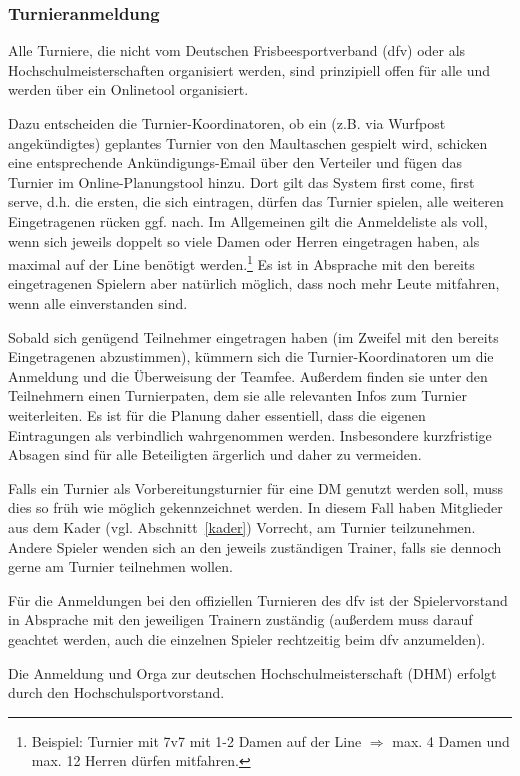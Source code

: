 \documentclass[a4 paper, 11pt]{article}
\begin{document}
\subsubsection{Turnieranmeldung}
Alle Turniere, die nicht vom Deutschen Frisbeesportverband (dfv) oder als Hochschulmeisterschaften organisiert werden, sind prinzipiell offen für alle und werden über ein Onlinetool organisiert.

Dazu entscheiden die Turnier-Koordinatoren, ob ein (z.B. via Wurfpost angekündigtes) geplantes Turnier von den Maultaschen gespielt wird, schicken eine entsprechende Ankündigungs-Email über den Verteiler und fügen das Turnier im Online-Planungstool hinzu. Dort gilt das System \glqq first come, first serve\grqq, d.h. die ersten, die sich eintragen, dürfen das Turnier spielen, alle weiteren Eingetragenen rücken ggf. nach. Im Allgemeinen gilt die Anmeldeliste als voll, wenn sich jeweils doppelt so viele Damen oder Herren eingetragen haben, als maximal auf der Line benötigt werden.\footnote{Beispiel: Turnier mit 7v7 mit 1-2 Damen auf der Line $\Rightarrow$ max. 4 Damen und max. 12 Herren dürfen mitfahren.}
Es ist in Absprache mit den bereits eingetragenen Spielern aber natürlich möglich, dass noch mehr Leute mitfahren, wenn alle einverstanden sind.

Sobald sich genügend Teilnehmer eingetragen haben (im Zweifel mit den bereits Eingetragenen abzustimmen), kümmern sich die Turnier-Koordinatoren um die Anmeldung und die Überweisung der Teamfee. Außerdem finden sie unter den Teilnehmern einen Turnierpaten, dem sie alle relevanten Infos zum Turnier weiterleiten.
Es ist für die Planung daher essentiell, dass die eigenen Eintragungen als verbindlich wahrgenommen werden. Insbesondere kurzfristige Absagen sind für alle Beteiligten ärgerlich und daher zu vermeiden.

Falls ein Turnier als Vorbereitungsturnier für eine DM genutzt werden soll, muss dies so früh wie möglich gekennzeichnet werden. In diesem Fall haben Mitglieder aus dem Kader (vgl. Abschnitt~\ref{kader}) Vorrecht, am Turnier teilzunehmen. Andere Spieler wenden sich an den jeweils zuständigen Trainer, falls sie dennoch gerne am Turnier teilnehmen wollen.

Für die Anmeldungen bei den offiziellen Turnieren des dfv ist der Spielervorstand in Absprache mit den jeweiligen Trainern zuständig (außerdem muss darauf geachtet werden, auch die einzelnen Spieler rechtzeitig beim dfv anzumelden).
	
Die Anmeldung und Orga zur deutschen Hochschulmeisterschaft (DHM) erfolgt durch den Hochschulsportvorstand.
\end{document}
